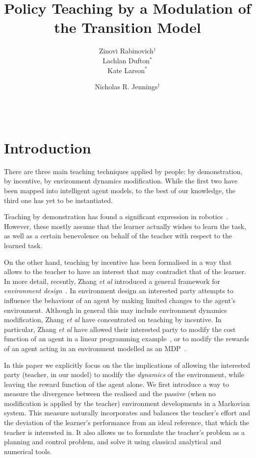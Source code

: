 \documentclass[letterpaper]{aamas2010}
\author{\alignauthor Zinovi Rabinovich$^{\dagger}$\\
  \email{zr@ecs.soton.ac.uk}
\alignauthor Lachlan Dufton$^*$\\ 
  \email{ltdufton@cs.uwaterloo.ca}
\alignauthor Kate Larson$^*$\\
  \email{klarson@cs.uwaterloo.ca}
\and
\alignauthor Nicholas R. Jennings$^{\dagger}$\\
  \email{nrj@ecs.soton.ac.uk}
\sharedaffiliation
  \affaddr{$^{\dagger}$Electronics and Computer Science, University of Southampton, United Kingdom}\\
  \affaddr{$^*$Cheriton School of Computer Science, University of Waterloo, Canada}\\
}
\title{Policy  Teaching by a Modulation of the Transition Model}
\begin{document}
\maketitle

\section{Introduction}

There are three main teaching techniques applied by people: by
demonstration, by incentive, by environment dynamics
modification. While the
first two have been mapped into intelligent agent models, to the best
of our knowledge, the third one has yet to be instantiated.

Teaching by demonstration has found a significant expression in
robotics~\cite{argal_etal_2009}. However, these mostly assume that the
learner actually wishes to learn the task, as well as a certain
benevolence on behalf of the teacher with respect to the learned
task.

On the other hand, teaching by incentive has been formalised in a way
that allows to the teacher to have an interest that may contradict
that of the learner. In more detail, recently, Zhang \emph{et al}
introduced a general framework for \emph{environment
  design}~\cite{Zhang09:General}. In environment design an interested
party attempts to influence the behaviour of an agent by making limited
changes to the agent's environment. Although in general this may
include environment dynamics modification, Zhang \emph{et al} have
concentrated on teaching by incentive. In particular, Zhang \emph{et
  al} have allowed their interested party to modify the cost function
of an agent in a linear programming example~\cite{Zhang09:General}, or
to modify the rewards of an agent acting in an environment modelled as
an MDP~\cite{zhang_parkes_2008,Zhang09:Policy}.

In this paper we explicitly focus on the the implications of allowing
the interested party (teacher, in our model) to modify the
\emph{dynamics} of the environment, while leaving the reward function
of the agent alone. We first introduce a way to measure the divergence
between the realised and the passive (when no modification is applied
by the teacher) environment developments in a Markovian system. This
measure naturally incorporates and balances the teacher's effort and
the deviation of the learner's performance from an ideal reference,
that which the teacher is interested in. It also allows us to
formulate the teacher's problem as a planning and control problem, and
solve it using classical analytical and numerical tools.
\end{document}
